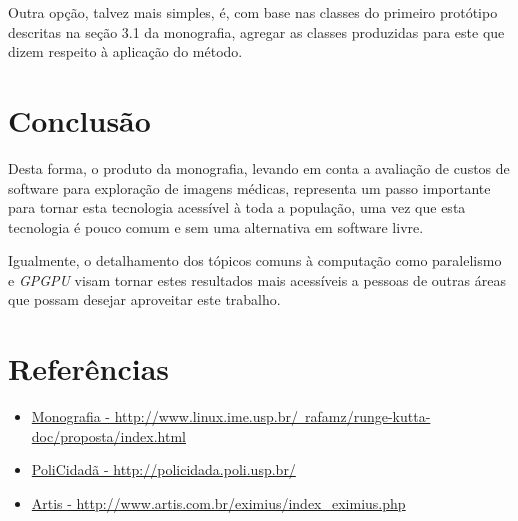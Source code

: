 \documentclass[a4paper,11pt]{report}
\begin{document}
  Outra opção, talvez mais simples, é, com base nas classes do primeiro protótipo descritas na seção 3.1 da monografia, agregar as classes produzidas para este que dizem respeito à aplicação do método.

\chapter{Conclusão}
Desta forma, o produto da monografia, levando em conta a avaliação de custos de software para exploração de imagens médicas, representa um passo importante para tornar esta tecnologia acessível à toda a população, uma vez que esta tecnologia é pouco comum e sem uma alternativa em software livre.

Igualmente, o detalhamento dos tópicos comuns à computação como paralelismo e \textit{GPGPU} visam tornar estes resultados mais acessíveis a pessoas de outras áreas que possam desejar aproveitar este trabalho.

\chapter{Referências}
\begin{itemize}
  \item\label{monografia} \href{http://www.linux.ime.usp.br/~rafamz/runge-kutta-doc/proposta/index.html}{Monografia - http://www.linux.ime.usp.br/~rafamz/runge-kutta-doc/proposta/index.html}
  \item\label{policidada} \href{http://policidada.poli.usp.br/}{PoliCidadã - http://policidada.poli.usp.br/}
  \item\label{artis} \href{http://www.artis.com.br/eximius/index\_eximius.php}{Artis - http://www.artis.com.br/eximius/index\_eximius.php}
\end{itemize}
\end{document}
